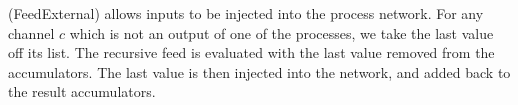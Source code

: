 (FeedExternal) allows inputs to be injected into the process network.
For any channel $c$ which is not an output of one of the processes, we take the last value off its list.
The recursive feed is evaluated with the last value removed from the accumulators.
The last value is then injected into the network, and added back to the result accumulators.









